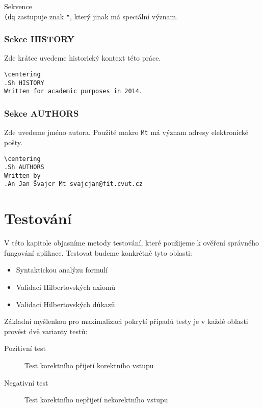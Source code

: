 \documentclass[thesis=B,czech,hidelinks]{FITthesis}[2012/06/26]
\begin{document}
Sekvence \texttt{\\(dq} zastupuje znak \texttt{"}, který jinak má speciální význam.

\subsection{Sekce HISTORY}

Zde krátce uvedeme historický kontext této práce.

\begin{verbatim}
\centering
.Sh HISTORY
Written for academic purposes in 2014.
\end{verbatim}

\subsection{Sekce AUTHORS}

Zde uvedeme jméno autora. Použité makro \texttt{Mt} má význam adresy elektronické pošty.

\begin{verbatim}
\centering
.Sh AUTHORS
Written by
.An Jan Švajcr Mt svajcjan@fit.cvut.cz
\end{verbatim}

%
%
%

\chapter{Testování}

V této kapitole objasníme metody testování, které použijeme k ověření správného fungování aplikace. Testovat budeme konkrétně tyto oblasti:

\begin{itemize}
	\item Syntaktickou analýzu formulí
	\item Validaci Hilbertovských axiomů
	\item Validaci Hilbertovských důkazů
\end{itemize}

Základní myšlenkou pro maximalizaci pokrytí případů testy je v každé oblasti provést dvě varianty testů:

\begin{description}
	\item[Pozitivní test] Test korektního přijetí korektního vstupu
	\item[Negativní test] Test korektního nepřijetí nekorektního vstupu
\end{description}
\end{document}
